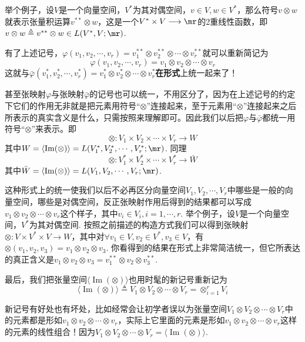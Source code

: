 举个例子，设$V$是一个向量空间，$V^{\ast}$为其对偶空间，$v\in V,w\in V^{\ast}$，那么符号$v\otimes w$就表示张量积运算$v^{\ast\ast}\otimes w$，这是一个$V^{\ast}\times V\longrightarrow \mr$的2重线性函数，即$v\otimes w\triangleq v^{\ast\ast}\otimes w\in L(V^{\ast},V;\mr)$. 

有了上述记号，$\varphi(v_{1},v_{2},\cdots,v_{r})= v^{\ast\ast}_{1}\otimes v^{\ast\ast}_{2}\otimes\cdots\otimes v^{\ast\ast}_{r}$就可以重新简记为
\[\varphi(v_{1},v_{2},\cdots,v_{r})=v_{1}\otimes v_{2}\otimes \cdots\otimes v_{r}\]
这就与$\bar{\varphi}(v^{\ast}_{1},v^{\ast}_{2},\cdots,v^{\ast}_{r})=v^{\ast}_{1}\otimes v^{\ast}_{2}\otimes \cdots\otimes v^{\ast}_{r}$\textbf{在形式}上统一起来了！

甚至张映射$\varphi$与张映射$\bar{\varphi}$的记号也可以统一，不用区分了，因为在上述记号的约定下它们的作用无非就是把元素用符号“$\otimes$”连接起来，至于元素用“$\otimes$”连接起来之后所表示的真实含义是什么，只需按照来理解即可。因此我们以后把$\varphi$与$\bar{\varphi}$都统一用符号“$\otimes$”来表示。即
\[
\otimes :V_{1}\times V_{2}\times\cdots\times V_{r}\longrightarrow W
\]
其中$W=\langle \operatorname{Im}(\otimes)\rangle=L(V^{\ast}_{1},V^{\ast}_{2},\cdots,V^{\ast}_{r};\mr)$. 同理
\[
\otimes :V^{\ast}_{1}\times V^{\ast}_{2}\times\cdots\times V^{\ast}_{r}\longrightarrow \bar{W}
\]
其中$\bar{W}=\langle \operatorname{Im}(\otimes)\rangle=L(V_{1},V_{2},\cdots,V_{r};\mr)$. 

这种形式上的统一使我们以后不必再区分向量空间$V_{1},V_{2},\cdots,V_{r}$中哪些是一般的向量空间，哪些是对偶空间，反正张映射作用后得到的结果都可以写成$v_{1}\otimes v_{2}\otimes \cdots\otimes v_{r}$这个样子，其中$v_{i}\in V_{i},i=1,\cdots,r$. 举个例子，设$V$是一个向量空间，$V^{\ast}$为其对偶空间. 按照之前描述的构造方式我们可以得到张映射$\otimes :V\times V^{\ast}\times V\longrightarrow W$，其中对$\forall v_{1}\in V,v_{2}\in V^{\ast},v_{3}\in V$，有$\otimes (v_{1},v_{2},v_{3})=v_{1}\otimes v_{2}\otimes v_{3}$. 你看得到的结果在形式上非常简洁统一，但它所表达的真正含义是$v_{1}\otimes v_{2}\otimes v_{3}=v^{\ast\ast}_{1}\otimes v_{2}\otimes v^{\ast\ast}_{3}$. 

最后，我们把张量空间$\langle\operatorname{Im}(\otimes ) \rangle$也用时髦的新记号重新记为
\[
\langle\operatorname{Im}(\otimes) \rangle\triangleq V_{1}\otimes V_{2}\otimes\cdots\otimes V_{r}=\otimes_{i=1}^{r}V_{i}
\] 

\begin{remark}
	新记号有好处也有坏处，比如经常会让初学者误以为张量空间$V_{1}\otimes V_{2}\otimes\cdots\otimes V_{r}$中的元素都是形如$v_{1}\otimes v_{2}\otimes \cdots\otimes v_{r}$，实际上它里面的元素是形如$v_{1}\otimes v_{2}\otimes \cdots\otimes v_{r}$这样的元素的线性组合！因为$V_{1}\otimes V_{2}\otimes\cdots\otimes V_{r}=\langle\operatorname{Im}(\otimes) \rangle$.
\end{remark}

